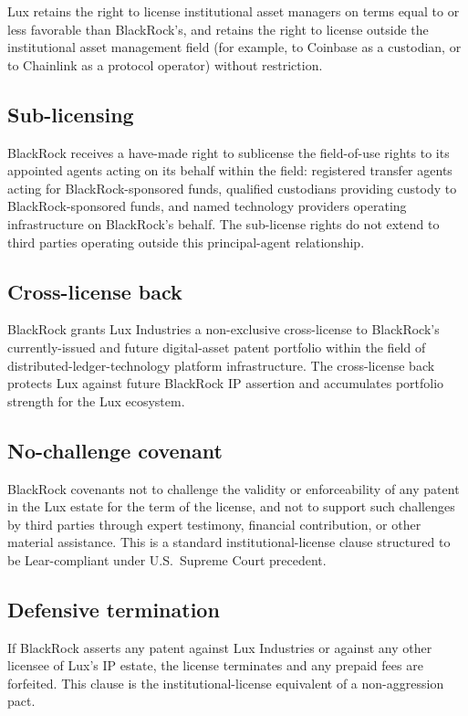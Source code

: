 \documentclass[11pt,letterpaper]{article}
\begin{document}
Lux retains the right to license institutional asset managers on terms equal to or less favorable than BlackRock's, and retains the right to license outside the institutional asset management field (for example, to Coinbase as a custodian, or to Chainlink as a protocol operator) without restriction.

\subsection{Sub-licensing}

BlackRock receives a have-made right to sublicense the field-of-use rights to its appointed agents acting on its behalf within the field: registered transfer agents acting for BlackRock-sponsored funds, qualified custodians providing custody to BlackRock-sponsored funds, and named technology providers operating infrastructure on BlackRock's behalf. The sub-license rights do not extend to third parties operating outside this principal-agent relationship.

\subsection{Cross-license back}

BlackRock grants Lux Industries a non-exclusive cross-license to BlackRock's currently-issued and future digital-asset patent portfolio within the field of distributed-ledger-technology platform infrastructure. The cross-license back protects Lux against future BlackRock IP assertion and accumulates portfolio strength for the Lux ecosystem.

\subsection{No-challenge covenant}

BlackRock covenants not to challenge the validity or enforceability of any patent in the Lux estate for the term of the license, and not to support such challenges by third parties through expert testimony, financial contribution, or other material assistance. This is a standard institutional-license clause structured to be Lear-compliant under U.S.\ Supreme Court precedent.

\subsection{Defensive termination}

If BlackRock asserts any patent against Lux Industries or against any other licensee of Lux's IP estate, the license terminates and any prepaid fees are forfeited. This clause is the institutional-license equivalent of a non-aggression pact.
\end{document}
